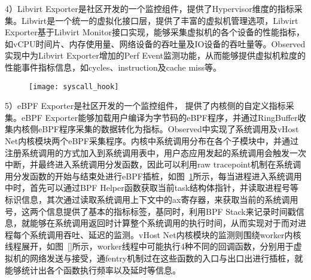 4）Libvirt Exporter是社区开发的一个监控组件，提供了Hypervisor维度的指标采集。Libvirt是一个统一的虚拟化接口层，提供了丰富的虚拟机管理选项，Libvirt Exporter基于Libvirt Monitor接口实现，能够采集虚拟机的各个设备的性能指标，如vCPU时间片、内存使用量、网络设备的吞吐量及IO设备的吞吐量等。Observed实现中为Libvirt Exporter增加的Perf Event监测功能，从而能够提供虚拟机粒度的性能事件指标信息，如cycles、instruction及cache miss等。

\begin{figure}[!htbp]
    \centering
    \texttt{[image: syscall\_hook]}
    \label{fig:syscall_hook}
\end{figure}

5）eBPF Exporter是社区开发的一个监控组件， 提供了内核侧的自定义指标采集。eBPF Exporter能够加载用户编译为字节码的eBPF程序，并通过RingBuffer收集内核侧eBPF程序采集的数据转化为指标。Observed中实现了系统调用及vHost Net内核模块两个eBPF采集程序。内核中系统调用分布在各个子模块中，并通过注册系统调用的方式加入到系统调用表中，用户态应用发起的系统调用会触发一次中断，并最终进入系统调用分发函数，因此可以利用raw tracepoint机制在系统调用分发函数的开始与结束处进行eBPF插桩，如图~\ref{fig:syscall_hook}所示，每当进程进入系统调用中时，首先可以通过BPF Helper函数获取当前task结构体指针，并读取进程号等标识信息，其次通过读取系统调用上下文中的ax寄存器，来获取当前的系统调用号，这两个信息提供了基本的指标标签，基同时，利用BPF Stack来记录时间戳信息，就能够在系统调用返回时计算整个系统调用的执行时间，从而实现对于而对进程每个系统调用吞吐、延迟的监测。vHost Net内核模块的监测则围绕worker内核线程展开，如图~\ref{}所示，worker线程中可能执行4种不同的回调函数，分别用于虚拟机的网络发送与接受，通fentry机制过在这些函数的入口与出口出进行插桩，就能够统计出各个函数执行频率以及延时等信息。

